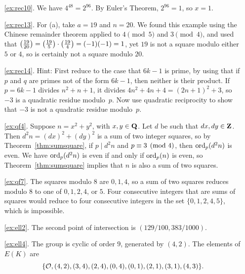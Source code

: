 \begin{itemize}
\begin{enumerate}
\item[\ref{ex:rec10}.] We have $4^{48} = 2^{96}$.
By Euler's Theorem, $2^{96}=1$, so $x=1$.

\item[\ref{ex:rec13}.] For (a), take $a=19$ and $n=20$.  We
found this example using the Chinese remainder theorem applied
to $4\pmod{5}$ and $3\pmod{4}$, and used that
$\left(\frac{19}{20}\right) = \left(\frac{19}{5}\right)\cdot\left(\frac{19}{4}\right) = (-1)(-1)=1$,
yet $19$ is not a square modulo either $5$ or $4$, so is
certainly not a square modulo $20$.

\item[\ref{ex:rec14}.]  Hint: First reduce to the case that $6k-1$ is
  prime, by using that if $p$ and $q$ are primes not of the form
  $6k-1$, then neither is their product.  If $p=6k-1$ divides
  $n^2+n+1$, it divides $4n^2+4n+4 = (2n+1)^2+3$, so $-3$ is a
  quadratic residue modulo~$p$.  Now use quadratic reciprocity to show
  that $-3$ is not a quadratic residue modulo~$p$.


\end{enumerate}

\begin{enumerate}
\item[\ref{ex:qf4}.] Suppose $n=x^2+y^2$, with $x,y\in\mathbf{Q}$.  Let $d$ be
  such that $dx, dy\in\mathbf{Z}$.  Then $d^2 n = (dx)^2 + (dy)^2$ is a sum of
  two integer squares, so by Theorem~\ref{thm:sumsquare}, if $p\mid d^2
  n$ and $p\equiv 3\pmod{4}$, then $\operatorname{ord}_p(d^2n)$ is even.  We have
  $\operatorname{ord}_p(d^2n)$ is even if and only if $\operatorname{ord}_p(n)$ is even, so
  Theorem~\ref{thm:sumsquare} implies that $n$ is also a sum of two
  squares.

\item[\ref{ex:qf7}.] The squares modulo $8$ are $0,1,4$, so a sum
of two squares reduces modulo $8$ to one of $0,1,2,4$, or $5$.
Four consecutive integers that are sums of squares would reduce to
four consecutive integers in the set $\{0,1,2,4,5\}$, which
is impossible.
\end{enumerate}

\begin{enumerate}
\item[\ref{ex:ell2}.] The second point of intersection is
$(129/100, 383/1000)$.

\item[\ref{ex:ell4}.] The group is cyclic of order $9$, generated
by $(4,2)$.  The elements of $E(K)$ are
$$\{\mathcal{O}, (4,2), (3,4), (2,4), (0,4), (0,1), (2,1), (3,1), (4,3)\}.$$


\end{enumerate}
\end{itemize}
